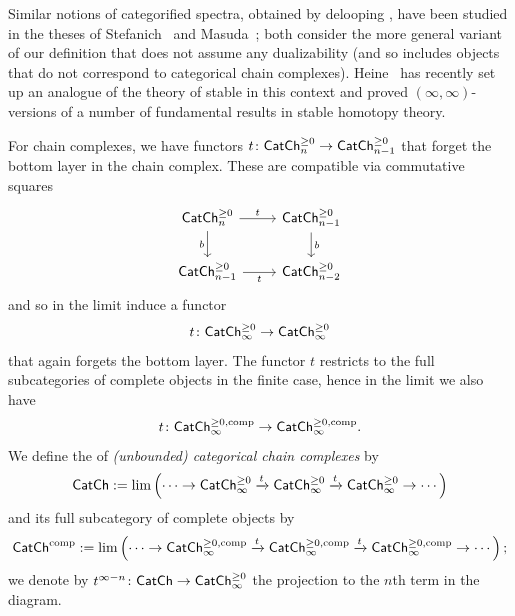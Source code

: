 \documentclass[a4paper,11pt]{article}
\begin{document}
\begin{remark}
  Similar notions of categorified spectra, obtained by delooping \iicats{}, have been
  studied in the theses of Stefanich~\cite[Ch.~13]{Stefanich} and
  Masuda~\cite{Masuda}; both consider the more general variant of our
  definition that does not assume any dualizability (and so includes
  objects that do not correspond to categorical chain
  complexes). Heine~\cite{HeineSp} has recently set up an analogue of
  the theory of stable \icats{} in this context and proved
  $(\infty,\infty)$-versions of a number of fundamental results in stable
  homotopy theory.
\end{remark}

\begin{defn}
  For chain complexes, we have functors $t \colon \CChp_{n} \to
  \CChp_{n-1}$ that forget the bottom layer in the chain
  complex. These are compatible via commutative squares
  \[
    \begin{tikzcd}
     \CChp_{n} \ar[r, "t"] \ar[d, "b"'] & \CChp_{n-1}  \ar[d, "b"] \\
     \CChp_{n-1} \ar[r, "t"'] & \CChp_{n-2}
    \end{tikzcd}
  \]
  and so in the limit induce a functor
  \[ t \colon \CChp_{\infty} \to \CChp_{\infty}\]
  that again forgets the bottom layer.
  The functor $t$ restricts to the full subcategories of complete
  objects in the finite case, hence in the limit we also have
  \[ t \colon \CChpc_{\infty} \to \CChpc_{\infty}.\]  
  We define the \icat{} of \emph{(unbounded) categorical chain
    complexes} by
    \[ \CCh := \lim \left(\cdots \to \CChp_{\infty} \xto{t}
      \CChp_{\infty} \xto{t}
      \CChp_{\infty} \to \cdots \right) \]
  and its full subcategory of complete objects by
    \[ \CChc := \lim \left(\cdots \to \CChpc_{\infty} \xto{t}
      \CChpc_{\infty} \xto{t}
      \CChpc_{\infty} \to \cdots \right); \]
  we denote by $t^{\infty-n} \colon \CCh \to \CChp_{\infty}$ the
  projection to the $n$th term in the diagram.
\end{defn}
\end{document}
